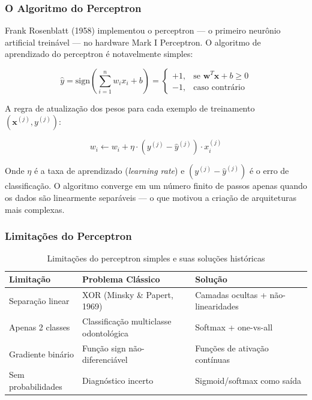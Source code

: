 \subsubsection{O Algoritmo do Perceptron}

Frank Rosenblatt (1958) implementou o perceptron --- o primeiro neurônio artificial
treinável --- no hardware Mark I Perceptron. O algoritmo de aprendizado do perceptron
é notavelmente simples:

\begin{equation}
  \hat{y} = \text{sign}\left(\sum_{i=1}^{n} w_i x_i + b\right) = \begin{cases}
    +1, & \text{se } \mathbf{w}^T\mathbf{x} + b \geq 0 \\
    -1, & \text{caso contrário}
  \end{cases}
  \label{eq:perceptron}
\end{equation}

A regra de atualização dos pesos para cada exemplo de treinamento $(\mathbf{x}^{(j)}, y^{(j)})$:

\begin{equation}
  w_i \leftarrow w_i + \eta \cdot (y^{(j)} - \hat{y}^{(j)}) \cdot x_i^{(j)}
  \label{eq:perceptron-update}
\end{equation}

Onde $\eta$ é a taxa de aprendizado (\textit{learning rate}) e $(y^{(j)} - \hat{y}^{(j)})$
é o erro de classificação. O algoritmo converge em um número finito de passos apenas
quando os dados são linearmente separáveis --- o que motivou a criação de arquiteturas
mais complexas.

\subsubsection{Limitações do Perceptron}

\begin{table}[H]
  \centering
  \caption{Limitações do perceptron simples e suas soluções históricas}
  \label{tab:limitacoes-perceptron}
  \begin{tabularx}{\textwidth}{p{3.5cm}XX}
    \toprule
    \textbf{Limitação} & \textbf{Problema Clássico} & \textbf{Solução} \\
    \midrule
    Separação linear & XOR (Minsky \& Papert, 1969) & Camadas ocultas + não-linearidades \\
    Apenas 2 classes & Classificação multiclasse odontológica & Softmax + one-vs-all \\
    Gradiente binário & Função sign não-diferenciável & Funções de ativação contínuas \\
    Sem probabilidades & Diagnóstico incerto & Sigmoid/softmax como saída \\
    \bottomrule
  \end{tabularx}
\end{table}

